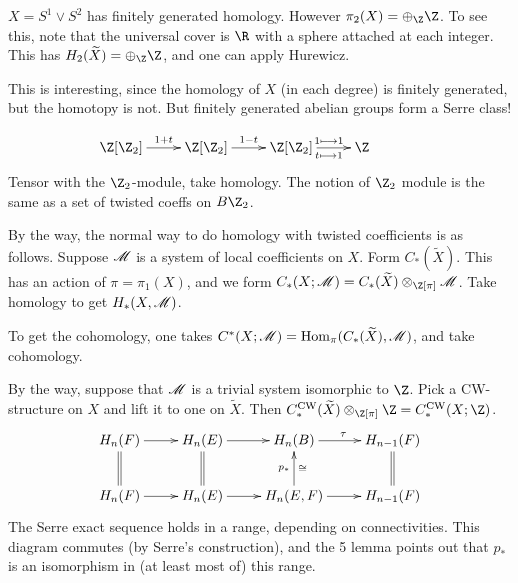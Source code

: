 \documentclass[11pt]{article}
\begin{document}
$X=S^1\vee S^2$ has finitely generated homology. However $\pi_2(X)=\oplus_\Z\Z$.
To see this, note that the universal cover is $\R$ with a sphere attached at
each integer. This has $H_2(\widetilde X)=\oplus_\Z\Z$, and one can apply
Hurewicz.

This is interesting, since the homology of $X$ (in each degree) is finitely
generated, but the homotopy is not. But finitely generated abelian groups form a
Serre class!

\[\xymatrix{
\Z[\Z_2]\ar[r]^{1+t}&
\Z[\Z_2]\ar[r]^{1-t}&
\Z[\Z_2]\ar[r]^{1\shortmapsto 1}_{t\shortmapsto1}&
\Z\ \ &\\
}\]
Tensor with the $\Z_2$-module, take homology.
The notion of $\Z_2$ module is the same as a set of twisted coeffs
on $B\Z_2$.

By the way, the normal way to do homology with twisted coefficients is as
follows.
Suppose $\mathscr{M}$ is a system of local coefficients on $X$. Form $C_*(\widetilde
X)$. This has an action of $\pi=\pi_1(X)$, and we form
$C_*(X;\scrM)=C_*(\widetilde X)\otimes_{\Z[\pi]}\scrM$. Take homology to get
$H_*(X,\mathscr{M})$.

To get the cohomology, one takes $C^*(X;\mathscr{M})=\operatorname{Hom}_{\pi}(C_*(\widetilde
X),\mathscr{M})$, and take cohomology.

By the way, suppose that $\mathscr{M}$ is a trivial system isomorphic to $\Z$. Pick a
CW-structure on $X$ and lift it to one on $\widetilde X$. Then
$C^\text{CW}_*(\widetilde X)\otimes_{\Z[\pi]}\Z=C^\text{CW}_*(X;\Z)$.
\[\xymatrix{
H_n(F)\ar[r]&H_n(E)\ar[r]&H_n(B)\ar[r]^\tau&H_{n-1}(F)\\
H_n(F)\ar[r]\ar@{=}[u]&H_n(E)\ar[r]\ar@{=}[u]&
H_n(E,F)\ar[r]\ar[u]^{p_*}_\cong&H_{n-1}(F)\ar@{=}[u]
}\]
The Serre exact sequence holds in a range, depending on connectivities. This
diagram commutes (by Serre's construction), and the 5 lemma points out that
$p_*$ is an isomorphism in (at least most of) this range.
\end{document}
